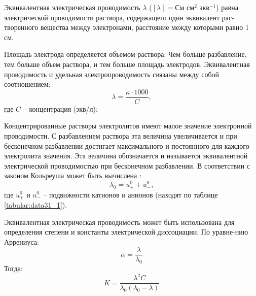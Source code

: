 Эквивалентная электрическая проводимость $\lambda$ ($[\lambda]=$См см$^{2}$ экв$^{-1}$) равна электрической проводимости  раствора, содержащего  один  эквивалент рас-творенного вещества между электронами, расстояние между которыми равно 1 см.

Площадь электрода определяется объемом раствора. Чем больше разбавление, тем больше  объем  раствора,  и  тем  больше  площадь электродов. Эквивалентная  проводимость и удельная электропроводимость связаны  между  собой  соотношением:
$$\lambda=\frac{\kappa\cdot 1000}{C},$$
где $C$ -- концентрация (экв/л);

Концентрированные растворы  электролитов имеют малое значение электронной проводимости. С разбавлением раствора эта величина увеличивается и при бесконечном разбавлении достигает максимального и постоянного для каждого электролита значения.  Эта  величина обозначается  и называется эквивалентной электрической проводимостью при бесконечном разбавлении. В соответствии с законом Кольреуша может быть вычислена :
$$\lambda_{0}=u_{+}^{0}+u_{-}^{0},$$
где $u_{+}^{0}$ и $u_{-}^{0}$ -- подвижности катионов и анионов (находят по таблице \ref{tabular:data31_1}).

Эквивалентная электрическая проводимость может быть использована для определения степени и константы  электрической диссоциации. По уравне-нию Аррениуса:
$$\alpha=\frac{\lambda}{\lambda_{0}}$$
Тогда:
$$K=\frac{\lambda^{2}C}{\lambda_{0}(\lambda_{0}-\lambda)}$$

